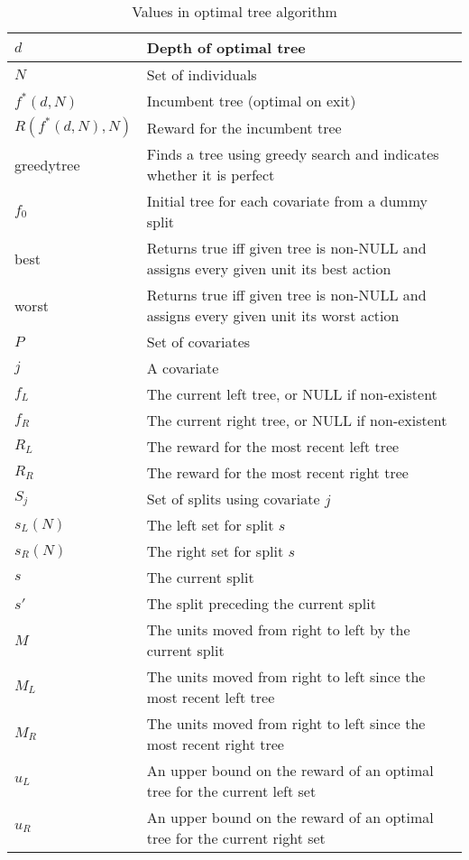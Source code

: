 \documentclass{article}
\begin{document}
\begin{table}
  \centering
  \begin{tabular}{|l|l|} \hline
    $d$ & Depth of optimal tree \\ \hline
    $N$ & Set of individuals \\ \hline
    $f^{*}(d,N)$ & Incumbent tree (optimal on exit) \\ \hline
    $R(f^{*}(d,N),N)$ & Reward for the incumbent tree \\ \hline
    greedytree & Finds a tree using greedy search and indicates
                 whether it is perfect \\ \hline
    $f_{0}$ & Initial tree for each covariate from a dummy split \\
    \hline
    best & Returns true iff given tree is non-NULL and assigns every
           given unit its best action \\ \hline
    worst & Returns true iff given tree is non-NULL and assigns every
           given unit its worst action \\ \hline 
    $P$ & Set of covariates \\ \hline
    $j$ & A covariate \\ \hline
    $f_L$ & The current left tree, or NULL if non-existent   \\ \hline
    $f_R$ & The current right tree, or NULL if non-existent   \\ \hline
    $R_L$ & The reward for the most recent left tree \\ \hline
    $R_R$ & The reward for the most recent right tree \\ \hline
    $S_j$ & Set of splits using covariate $j$ \\ \hline
    $s_{L}(N)$ & The left set for split $s$ \\ \hline
    $s_{R}(N)$ & The right set for split $s$ \\ \hline
    $s$ & The current split \\ \hline
    $s'$ & The split preceding the current split \\ \hline
    $M$ & The units moved from right to left by the current split \\
    \hline
    $M_L$ & The units moved from right to left since the most recent
            left tree \\ \hline
    $M_R$ & The units moved from right to left since the most recent
            right tree \\ \hline
    $u_L$ & An upper bound on the reward of an optimal tree for the
            current left set \\ \hline
    $u_R$ & An upper bound on the reward of an optimal tree for the
            current right set \\ \hline
  \end{tabular}
  \caption{Values in optimal tree algorithm}
  
  \label{tab:explanation}
\end{table}
\end{document}
